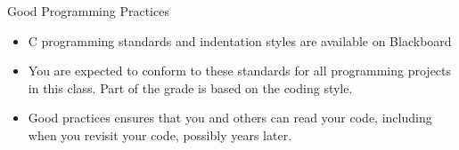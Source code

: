 \documentclass[graphics]{beamer}
\begin{document}
\begin{frame}{Good Programming Practices}
    \begin{itemize}
        \item C programming standards and indentation styles are available on Blackboard
        \item You are expected to conform to these standards for all programming projects in this class. Part of the grade is based on the coding style.
        \item Good practices ensures that you and others can read your code, including when you revisit your code, possibly years later.
    \end{itemize}
\end{frame}
\end{document}
